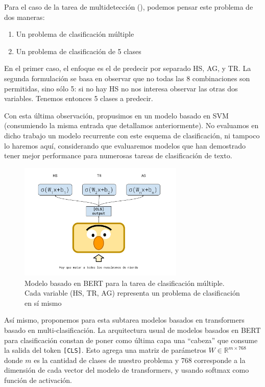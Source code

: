 Para el caso de la tarea de multidetección (\subtaskb{}), podemos pensar este problema de dos maneras:

\begin{enumerate}
    \item Un problema de clasificación múltiple
    \item Un problema de clasificación de 5 clases
\end{enumerate}

En el primer caso, el enfoque es el de predecir por separado HS, AG, y TR. La segunda formulación se basa en observar que no todas las 8 combinaciones son permitidas, sino sólo 5: si no hay HS no nos interesa observar las otras dos variables. Tenemos entonces 5 clases a predecir.

Con esta última observación, propusimos en \citet{atalaya_tass2018} un modelo basado en SVM (consumiendo la misma entrada que detallamos anteriormente). No evaluamos en dicho trabajo un modelo recurrente con este esquema de clasificación, ni tampoco lo haremos aquí, considerando que evaluaremos modelos que han demostrado tener mejor performance para numerosas tareas de clasificación de texto.

\begin{figure}
    \centering
    \includegraphics[width=0.7\textwidth]{img/bert_model_hateval.pdf}
    \caption{Modelo basado en BERT para la tarea de clasificación múltiple. Cada variable (HS, TR, AG) representa un problema de clasificación en sí mismo}
    \label{fig:bert_hateval_classifier}
\end{figure}


Así mismo, proponemos para esta subtarea modelos basados en transformers basado en multi-clasificación. La arquitectura usual de modelos basados en BERT para clasificación constan de poner como última capa una  ``cabeza'' que consume la salida del token \verb|[CLS]|. Esto agrega una matriz de parámetros $W \in \mathbb{R}^{m \times 768}$ donde $m$ es la cantidad de clases de nuestro problema y 768 corresponde a la dimensión de cada vector del modelo de transformers, y usando softmax como función de activación.


